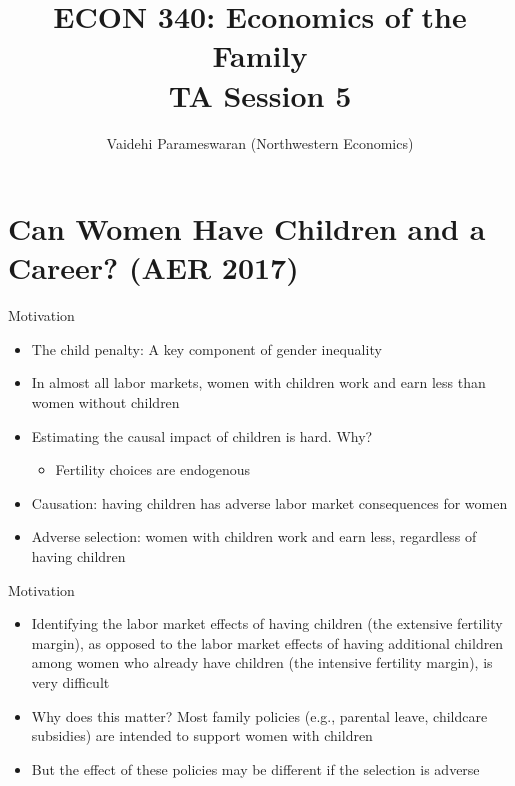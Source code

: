 \documentclass[11pt,notes=hide,aspectratio=169,mathserif]{beamer}
\title[class]{ECON 340: Economics of the Family \\ TA Session 5}
\author[Vaidehi's class]{Vaidehi Parameswaran (Northwestern Economics)}
\date{\monthname[\the\month] \the\year}
\begin{document}
\begin{frame}[plain]
\titlepage
\end{frame}

\section{Can Women Have Children and a Career? (AER 2017)}



\begin{frame}{Motivation}
\begin{itemize}
  \item The child penalty: A key component of gender inequality
  \item In almost all labor markets, women with children work and earn less than women
  without children
  \item Estimating the causal impact of children is hard. Why?
    \pause \begin{itemize}
      \item Fertility choices are endogenous
    \end{itemize}
  \item  Causation: having children has
  adverse labor market consequences for women
  \item Adverse
  selection: women with children work and earn less, regardless of having
  children
\end{itemize}
\end{frame}

\begin{frame}{Motivation}
\begin{itemize}
  \item  Identifying the labor market effects of
  having children (the extensive fertility margin), as opposed to the labor market
  effects of having additional children among women who already have children (the
  intensive fertility margin), is very difficult
  \item Why does this matter? Most family policies (e.g., parental leave, childcare subsidies) are intended to support women with children 
  \item But the effect of these policies may be different if the selection is adverse 
\end{itemize}
\end{frame}
\end{document}
